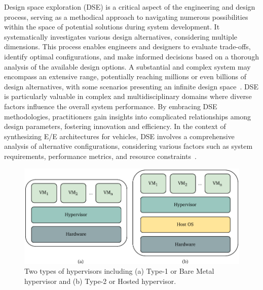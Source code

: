     Design space exploration (DSE) is a critical aspect of the engineering and design process, serving as a methodical approach to navigating numerous possibilities within the space of potential solutions during system development. It systematically investigates various design alternatives, considering multiple dimensions. This process enables engineers and designers to evaluate trade-offs, identify optimal configurations, and make informed decisions based on a thorough analysis of the available design options.
    A substantial and complex system may encompass an extensive range, potentially reaching millions or even billions of design alternatives, with some scenarios presenting an infinite design space~\cite{kang2011approach}. DSE is particularly valuable in complex and multidisciplinary domains where diverse factors influence the overall system performance. By embracing DSE methodologies, practitioners gain insights into complicated relationships among design parameters, fostering innovation and efficiency. In the context of synthesizing E/E architectures for vehicles, DSE involves a comprehensive analysis of alternative configurations, considering various factors such as system requirements, performance metrics, and resource constraints~\cite{9613692, 9565115}.


    
    
    
  
     \begin{figure}[ht]
    \centering
    \includegraphics[width=1\textwidth]{figures/hypervisor.pdf}
    \caption{Two types of hypervisors including (a) Type-1 or Bare Metal hypervisor and (b) Type-2 or    Hosted hypervisor.}
    \label{fig24}
    \vspace{-8pt}
    \end{figure}

